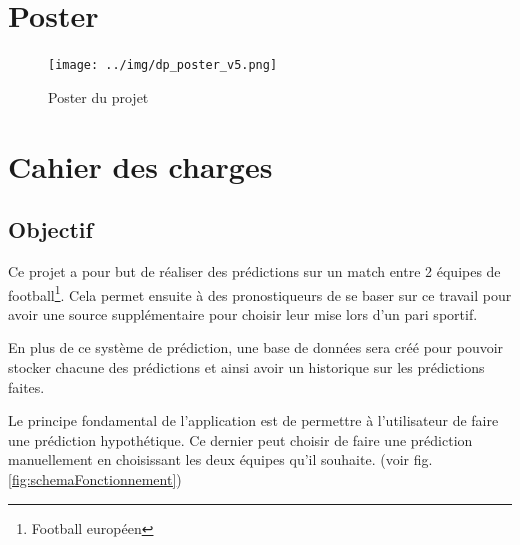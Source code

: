 \documentclass[a4paper,14pt]{extarticle}
\begin{document}
{\newpage

\section{Poster}

\begin{figure}[htp]
    \centering
    \texttt{[image: ../img/dp\_poster\_v5.png]}
    \caption{Poster du projet}
    \label{fig:poster}
\end{figure}

\section{Cahier des charges}

\subsection{Objectif}

Ce projet a pour but de réaliser des prédictions sur un match entre 2 équipes de football\footnote{Football européen}. Cela permet ensuite à des pronostiqueurs de se baser sur ce travail pour avoir une source supplémentaire pour choisir leur mise lors d'un pari sportif. 

En plus de ce système de prédiction, une base de données sera créé pour pouvoir stocker chacune des prédictions et ainsi avoir un historique sur les prédictions faites. 

Le principe fondamental de l'application est de permettre à l'utilisateur de faire une prédiction hypothétique. Ce dernier peut choisir de faire une prédiction manuellement en choisissant les deux équipes qu'il souhaite. (voir fig. \ref{fig:schemaFonctionnement})

}
\end{document}
